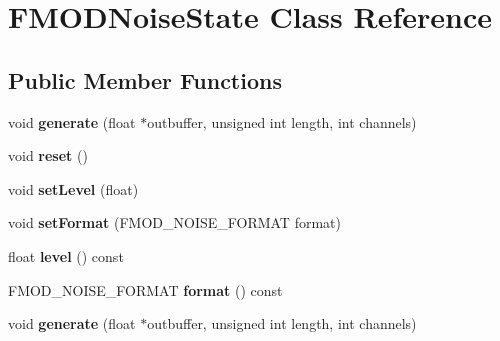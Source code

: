 \hypertarget{class_f_m_o_d_noise_state}{\section{F\+M\+O\+D\+Noise\+State Class Reference}
\label{class_f_m_o_d_noise_state}
}
\subsection*{Public Member Functions}
\begin{DoxyCompactItemize}
\item 
\hypertarget{class_f_m_o_d_noise_state_af8030226d0c62bf0221b8149ba344d9e}{void {\bfseries generate} (float $\ast$outbuffer, unsigned int length, int channels)}\label{class_f_m_o_d_noise_state_af8030226d0c62bf0221b8149ba344d9e}

\item 
\hypertarget{class_f_m_o_d_noise_state_a7c9def298fdd6b60e61d5595c69c27d6}{void {\bfseries reset} ()}\label{class_f_m_o_d_noise_state_a7c9def298fdd6b60e61d5595c69c27d6}

\item 
\hypertarget{class_f_m_o_d_noise_state_af6c9800805be5596fbaaeaadb9a9a6d2}{void {\bfseries set\+Level} (float)}\label{class_f_m_o_d_noise_state_af6c9800805be5596fbaaeaadb9a9a6d2}

\item 
\hypertarget{class_f_m_o_d_noise_state_a745166f54b6b89ec8ab3f33e74f2e15f}{void {\bfseries set\+Format} (F\+M\+O\+D\+\_\+\+N\+O\+I\+S\+E\+\_\+\+F\+O\+R\+M\+A\+T format)}\label{class_f_m_o_d_noise_state_a745166f54b6b89ec8ab3f33e74f2e15f}

\item 
\hypertarget{class_f_m_o_d_noise_state_af01871265560a325320f54b4e7e8f1e6}{float {\bfseries level} () const }\label{class_f_m_o_d_noise_state_af01871265560a325320f54b4e7e8f1e6}

\item 
\hypertarget{class_f_m_o_d_noise_state_af426ae51a60088c077d35bd1028eee6f}{F\+M\+O\+D\+\_\+\+N\+O\+I\+S\+E\+\_\+\+F\+O\+R\+M\+A\+T {\bfseries format} () const }\label{class_f_m_o_d_noise_state_af426ae51a60088c077d35bd1028eee6f}

\item 
\hypertarget{class_f_m_o_d_noise_state_af8030226d0c62bf0221b8149ba344d9e}{void {\bfseries generate} (float $\ast$outbuffer, unsigned int length, int channels)}\label{class_f_m_o_d_noise_state_af8030226d0c62bf0221b8149ba344d9e}


\end{DoxyCompactItemize}
